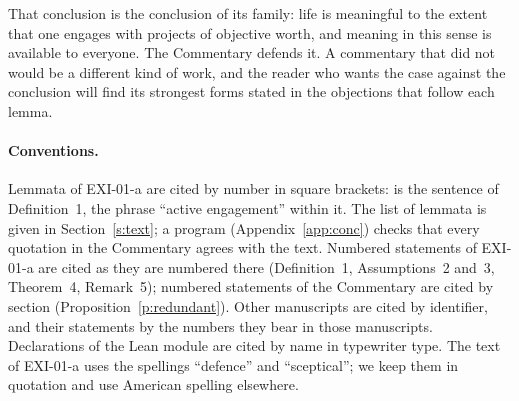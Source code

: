 That conclusion is the conclusion of its family: life is meaningful to the extent that one engages with projects of objective worth, and meaning in this sense is available to everyone. The Commentary defends it. A commentary that did not would be a different kind of work, and the reader who wants the case against the conclusion will find its strongest forms stated in the objections that follow each lemma.

\paragraph{Conventions.} Lemmata of EXI-01-a are cited by number in square brackets:  is the sentence of Definition~1,  the phrase \enquote{active engagement} within it. The list of lemmata is given in Section~\ref{s:text}; a program (Appendix~\ref{app:conc}) checks that every quotation in the Commentary agrees with the text. Numbered statements of EXI-01-a are cited as they are numbered there (Definition~1, Assumptions~2 and~3, Theorem~4, Remark~5); numbered statements of the Commentary are cited by section (Proposition~\ref{p:redundant}). Other manuscripts are cited by identifier, and their statements by the numbers they bear in those manuscripts. Declarations of the Lean module are cited by name in typewriter type. The text of EXI-01-a uses the spellings \enquote{defence} and \enquote{sceptical}; we keep them in quotation and use American spelling elsewhere.
